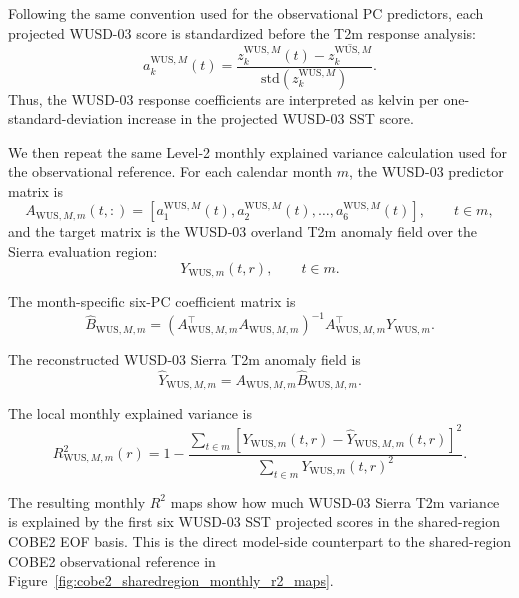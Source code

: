 \documentclass[11pt]{article}
\begin{document}
Following the same convention used for the observational PC predictors, each projected WUSD-03
score is standardized before the T2m response analysis:
\begin{equation}
a^{\mathrm{WUS},M}_{k}(t)
=
\frac{
z^{\mathrm{WUS},M}_{k}(t) - \overline{z^{\mathrm{WUS},M}_{k}}
}{
\mathrm{std}\!\left(z^{\mathrm{WUS},M}_{k}\right)
}.
\label{eq:wus_projected_score_standardization}
\end{equation}
Thus, the WUSD-03 response coefficients are interpreted as kelvin per one-standard-deviation
increase in the projected WUSD-03 SST score.

We then repeat the same Level-2 monthly explained variance calculation used for the observational
reference. For each calendar month $m$, the WUSD-03 predictor matrix is
\begin{equation}
A_{\mathrm{WUS},M,m}(t,:)
=
\left[
a^{\mathrm{WUS},M}_{1}(t),
a^{\mathrm{WUS},M}_{2}(t),
\dots,
a^{\mathrm{WUS},M}_{6}(t)
\right],
\qquad t \in m,
\end{equation}
and the target matrix is the WUSD-03 overland T2m anomaly field over the Sierra evaluation region:
\begin{equation}
Y_{\mathrm{WUS},m}(t,r),
\qquad t \in m.
\end{equation}

The month-specific six-PC coefficient matrix is
\begin{equation}
\widehat{B}_{\mathrm{WUS},M,m}
=
\left(
A_{\mathrm{WUS},M,m}^{\top}
A_{\mathrm{WUS},M,m}
\right)^{-1}
A_{\mathrm{WUS},M,m}^{\top}
Y_{\mathrm{WUS},m}.
\label{eq:wus_sharedregion_monthly_bhat}
\end{equation}

The reconstructed WUSD-03 Sierra T2m anomaly field is
\begin{equation}
\widehat{Y}_{\mathrm{WUS},M,m}
=
A_{\mathrm{WUS},M,m}
\widehat{B}_{\mathrm{WUS},M,m}.
\label{eq:wus_sharedregion_monthly_yhat}
\end{equation}

The local monthly explained variance is
\begin{equation}
R^{2}_{\mathrm{WUS},M,m}(r)
=
1
-
\frac{
\sum_{t \in m}
\left[
Y_{\mathrm{WUS},m}(t,r) - \widehat{Y}_{\mathrm{WUS},M,m}(t,r)
\right]^2
}{
\sum_{t \in m}
Y_{\mathrm{WUS},m}(t,r)^2
}.
\label{eq:wus_sharedregion_monthly_r2}
\end{equation}

The resulting monthly $R^2$ maps show how much WUSD-03 Sierra T2m variance is explained by the
first six WUSD-03 SST projected scores in the shared-region COBE2 EOF basis. This is the direct
model-side counterpart to the shared-region COBE2 observational reference in
Figure~\ref{fig:cobe2_sharedregion_monthly_r2_maps}.
\end{document}
